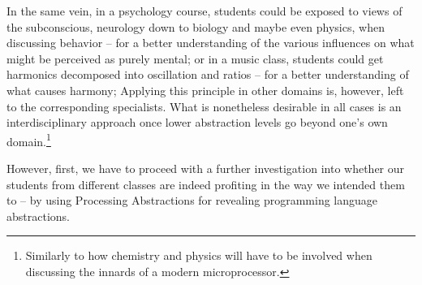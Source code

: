 In the same vein, in a psychology course, students could be exposed to views of the subconscious, neurology down to biology and maybe even physics, when discussing behavior -- for a better understanding of the various influences on what might be perceived as purely mental; or in a music class, students could get harmonics decomposed into oscillation and ratios -- for a better understanding of what causes harmony; \etc Applying this principle in other domains is, however, left to the corresponding specialists. What is nonetheless desirable in all cases is an interdisciplinary approach once lower abstraction levels go beyond one's own domain.\footnote{Similarly to how chemistry and physics will have to be involved when discussing the innards of a modern microprocessor.}

However, first, we have to proceed with a further investigation into whether our students from different classes are indeed profiting in the way we intended them to -- by using Processing Abstractions for revealing programming language abstractions.
